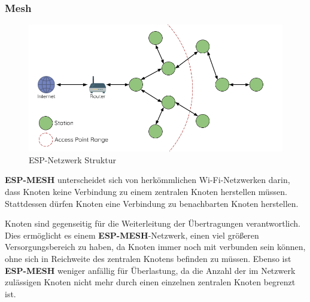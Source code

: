 \subsubsection{Mesh}
\begin{figure}[H] \begin{center}
    \includegraphics[scale=0.5]{diagrams/esp-mesh-network-architecture.png}
    \caption{ESP-Netzwerk Struktur \cite{esp-mesh}}
    \end{center}    
\end{figure}

\textbf{ESP-MESH} unterscheidet sich von herkömmlichen Wi-Fi-Netzwerken darin, dass Knoten keine Verbindung zu einem zentralen Knoten herstellen müssen. Stattdessen dürfen Knoten eine Verbindung zu benachbarten Knoten herstellen.

Knoten sind gegenseitig für die Weiterleitung der Übertragungen verantwortlich. Dies ermöglicht es einem \textbf{ESP-MESH}-Netzwerk, einen viel größeren Versorgungsbereich zu haben, da Knoten immer noch mit verbunden sein können, ohne sich in Reichweite des zentralen Knotens befinden zu müssen. Ebenso ist \textbf{ESP-MESH} weniger anfällig für Überlastung, da die Anzahl der im Netzwerk zulässigen Knoten nicht mehr durch einen einzelnen zentralen Knoten begrenzt ist.

